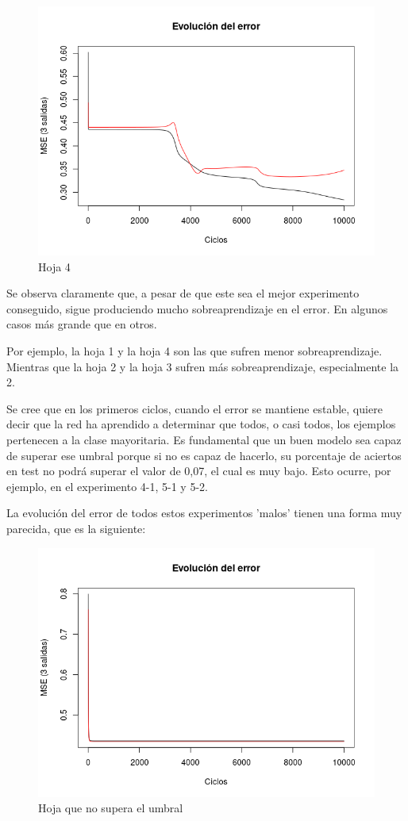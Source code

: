\documentclass{uc3mpracticas}
\begin{document}
\begin{figure}[!h]
\begin{minipage}{.52\textwidth}
  \includegraphics[width=.8\linewidth]{Images/best_fold4.png}
  \caption*{Hoja 4}
\end{minipage}
\end{figure}


Se observa claramente que, a pesar de que este sea el mejor experimento conseguido, sigue produciendo mucho sobreaprendizaje en el error. En algunos casos más grande que en otros.

\vspace{2mm}

Por ejemplo, la hoja 1 y la hoja 4 son las que sufren menor sobreaprendizaje. Mientras que la hoja 2 y la hoja 3 sufren más sobreaprendizaje, especialmente la 2.

\vspace{2mm}

Se cree que en los primeros ciclos, cuando el error se mantiene estable, quiere decir que la red ha aprendido a determinar que todos, o casi todos, los ejemplos pertenecen a la clase mayoritaria. Es fundamental que un buen modelo sea capaz de superar ese umbral porque si no es capaz de hacerlo, su porcentaje de aciertos en test no podrá superar el valor de 0,07, el cual es muy bajo. Esto ocurre, por ejemplo, en el experimento 4-1, 5-1 y 5-2.

\vspace{1mm}

La evolución del error de todos estos experimentos 'malos' tienen una forma muy parecida, que es la siguiente:

\begin{figure}[!h]
\centering
  \includegraphics[width=.4\linewidth]{Images/fail.png}
  \caption*{Hoja que no supera el umbral}
\end{figure}
\end{document}
